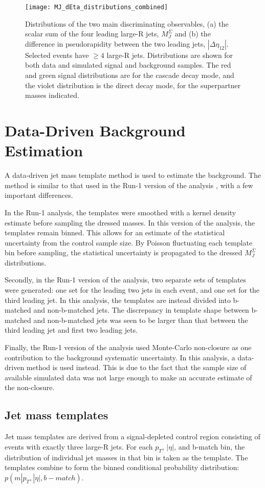 \begin{figure}[h]
\texttt{[image: MJ\_dEta\_distributions\_combined]}
\caption{Distributions of the two main discriminating observables, (a) the scalar sum of the four leading large-R jets, $M_{J}^{\Sigma}$ and (b) the difference in pseudorapidity between the two leading jets, $|\Delta\eta_{12}|$. Selected events have $\geq 4$ large-R jets. Distributions are shown for both data and simulated signal and background samples. The red and green signal distributions are for the cascade decay mode, and the violet distribution is the direct decay mode, for the superpartner masses indicated.}
\label{fig:MJ_dEta_distributions}
\end{figure}

\section{Data-Driven Background Estimation} \label{bkg_estimation}
A data-driven jet mass template method is used to estimate the
background. The method is similar to that used in the Run-1 version of
the analysis \cite{run1-multijet}, with a
few important differences.

In the Run-1 analysis, the templates were smoothed with a kernel
density estimate before sampling the dressed masses. In this version
of the analysis, the templates remain binned. This allows for an
estimate of the statistical uncertainty from the control sample
size. By Poisson fluctuating each template bin before sampling, the
statistical uncertainty is propagated to the dressed $M_J^{\Sigma}$
distributions.

Secondly, in the Run-1 version of the analysis, two separate sets of templates
were generated: one set for the leading two jets in each event, and
one set for the third leading jet. In this analysis, the templates are
instead divided into b-matched and non-b-matched jets. The discrepancy
in template shape between b-matched and non-b-matched jets was seen to
be larger than that between the third leading jet and first two
leading jets. 

Finally, the Run-1 version of the analysis used Monte-Carlo
non-closure as one contribution to the background systematic
uncertainty. In this analysis, a data-driven method is used
instead. This is due to the fact that the sample size of available
simulated data was not large enough to make an accurate estimate of
the non-closure.

\subsection{Jet mass templates}
Jet mass templates are derived from a signal-depleted control region
consisting of events with exactly three large-R jets. For each $p_T$,
$|\eta|$, and b-match bin, the distribution of individual jet masses
in that bin is taken as the template. The templates combine to form
the binned conditional probability distribution: $p(m|p_{T}, |\eta|,
b-match)$.

